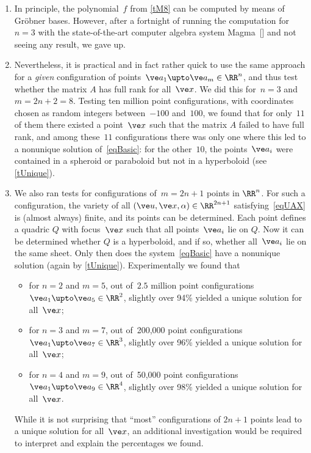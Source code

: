\documentclass[reqno]{amsart}
\begin{document}
\begin{rem} \label{rM8}%
  \begin{enumerate}[label=(\alph*)]
  \item \label{rM8A} In principle, the polynomial~$f$ from \cref{tM8}
    can be computed by means of Gr\"obner bases. However, after a
    fortnight of running the computation for $n = 3$ with the
    state-of-the-art computer algebra system
    Magma~[] and not seeing any result, we gave up.
  \item \label{rM8B} Nevertheless, it is practical and in fact rather
    quick to use the same approach for a {\em given} configuration of
    points~$\ve a_1 \upto \ve a_m \in \RR^n$, and thus test whether
    the matrix $A$ has full rank for all~$\ve x$. We did this
    for~$n = 3$ and~$m = 2 n + 2 = 8$. Testing ten million point
    configurations, with coordinates chosen as random integers
    between~$-100$ and~$100$, we found that for only~$11$ of them
    there existed a point~$\ve x$ such that the matrix $A$ failed to
    have full rank, and among these~$11$ configurations there was only
    one where this led to a nonunique solution of~\eqref{eqBasic}: for
    the other~$10$, the points~$\ve a_i$ were contained in a spheroid
    or paraboloid but not in a hyperboloid (see \cref{tUnique}).
  \item \label{rM8C} We also ran tests for configurations
    of~$m = 2 n + 1$ points in $\RR^n$. For such a configuration, the
    variety of all $(\ve u,\ve x,\alpha) \in \RR^{2 n + 1}$
    satisfying~\eqref{eqUAX} is (almost always) finite, and its points
    can be determined. Each point defines a quadric $Q$ with
    focus~$\ve x$ such that all points~$\ve a_i$ lie on $Q$. Now it
    can be determined whether $Q$ is a hyperboloid, and if so, whether
    all~$\ve a_i$ lie on the same sheet. Only then does the
    system~\eqref{eqBasic} have a nonunique solution (again by
    \cref{tUnique}). Experimentally we found that
    \begin{itemize}
    \item for $n = 2$ and $m = 5$, out of~$2.5$ million point
      configurations $\ve a_1 \upto \ve a_5 \in \RR^2$, slightly over
      94\% yielded a unique solution for all~$\ve x$;
    \item for $n = 3$ and $m = 7$, out of~200,000 point
      configurations $\ve a_1 \upto \ve a_7 \in \RR^3$, slightly over
      96\% yielded a unique solution for all~$\ve x$;
    \item for $n = 4$ and $m = 9$, out of~50,000 point configurations
      $\ve a_1 \upto \ve a_9 \in \RR^4$, slightly over 98\% yielded a
      unique solution for all~$\ve x$.
    \end{itemize}
    While it is not surprising that ``most'' configurations of
    $2 n + 1$ points lead to a unique solution for all~$\ve x$, an
    additional investigation would be required to interpret and
    explain the percentages we found. \remend
  \end{enumerate}
  \renewcommand{\remend}{}
\end{rem}
\end{document}

